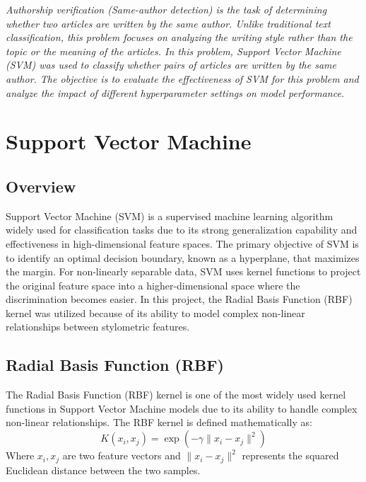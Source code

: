 \documentclass[11pt]{article}
\title{\vspace{-2.0em}{\color{accent}\textsf{\bfseries Authorship Verification Using Support Vector Machine}}}
\author{}
\date{}
\begin{document}
\maketitle
\vspace{-3.0em}

\noindent
\textit{Authorship verification (Same-author detection) is the task of determining whether two articles are written by the same author. Unlike traditional text classification, this problem focuses on analyzing the writing style rather than the topic or the meaning of the articles. In this problem, Support Vector Machine (SVM) was used to classify whether pairs of articles are written by the same author. The objective is to evaluate the effectiveness of SVM for this problem and analyze the impact of different hyperparameter settings on model performance.}

\section{Support Vector Machine}

\subsection{Overview}

Support Vector Machine (SVM) is a supervised machine learning algorithm widely used for classification tasks due to its strong generalization capability and effectiveness in high-dimensional feature spaces. The primary objective of SVM is to identify an optimal decision boundary, known as a hyperplane, that maximizes the margin. For non-linearly separable data, SVM uses kernel functions to project the original feature space into a higher-dimensional space where the discrimination becomes easier. In this project, the Radial Basis Function (RBF) kernel was utilized because of its ability to model complex non-linear relationships between stylometric features.

\subsection{Radial Basis Function (RBF)}

The Radial Basis Function (RBF) kernel is one of the most widely used kernel functions in Support Vector Machine models due to its ability to handle complex non-linear relationships. The RBF kernel is defined mathematically as:
\[
  K(x_{i},x_{j}) = \exp(-\gamma \lVert x_{i}-x_{j} \rVert^{2})
\]
Where $x_i, x_j$ are two feature vectors and $\lVert x_{i}-x_{j} \rVert^{2}$ represents the squared Euclidean distance between the two samples. 
\end{document}
